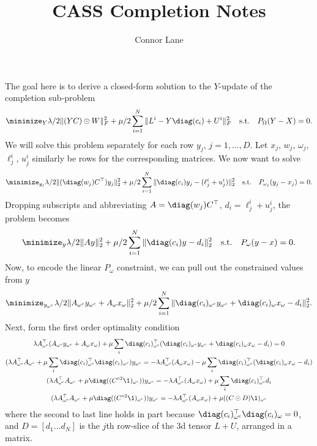 \documentclass[11pt,letterpaper]{article}
\begin{document}
\title{CASS Completion Notes}
\author{Connor Lane}
\maketitle

The goal here is to derive a closed-form solution to the $Y$-update of the
completion sub-problem
\[ \minimize_Y \lambda/2 \|(YC) \odot W \|_F^2 + \mu/2 \sum_{i=1}^N \|L^i - Y
\diag(c_i) + U^i \|_F^2 \quad \text{s.t.} \quad P_\Omega(Y-X) = 0. \]
We will solve this problem separately for each row $y_j$, $j=1, \dotsc, D$. Let
$x_j$, $w_j$, $\omega_j$, $\ell^i_j$, $u^i_j$ similarly be rows for the
corresponding matrices. We now want to solve
\[\minimize_{y_j} \lambda/2 \| (\diag(w_j) C^\top) y_j\|_2^2 + \mu/2
\sum_{i=1}^N \|\diag(c_i) y_j - (\ell_j^i + u_j^i)\|_2^2 \quad \text{s.t.}
\quad P_{\omega_j}(y_j - x_j) = 0. \]
Dropping subscripts and abbreviating $A = \diag(w_j) C^\top$, $d_i = \ell^i_j +
u^i_j$, the problem becomes
\[\minimize_{y} \lambda/2 \| A y\|_2^2 + \mu/2 \sum_{i=1}^N \|\diag(c_i) y -
d_i\|_2^2 \quad \text{s.t.} \quad P_{\omega}(y - x) = 0. \]
Now, to encode the linear $P_\omega$ constraint, we can pull out the
constrained values from $y$
\[\minimize_{y_{\omega^c}} \lambda/2 \| A_{\omega^c} y_{\omega^c} + A_{\omega}
x_{\omega} \|_2^2 + \mu/2 \sum_{i=1}^N \|\diag(c_i)_{\omega^c} y_{\omega^c} +
\diag(c_i)_{\omega} x_{\omega} - d_i\|_2^2. \]
Next, form the first order optimality condition
\begin{gather*}
  \lambda A_{\omega^c}^\top( A_{\omega^c} y_{\omega^c} + A_{\omega}
  x_{\omega}) + \mu \sum_i \diag(c_i)_{\omega^c}^\top (\diag(c_i)_{\omega^c}
  y_{\omega^c} + \diag(c_i)_{\omega} x_{\omega} - d_i) = 0 \\
  (\lambda A_{\omega^c}^\top A_{\omega^c} + \mu \sum_i
  \diag(c_i)_{\omega^c}^\top \diag(c_i)_{\omega^c}) y_{\omega^c} = - \lambda
  A_{\omega^c}^\top (A_{\omega} x_\omega) - \mu \sum_i \diag(c_i)_{\omega^c}^\top
  (\diag(c_i)_{\omega} x_{\omega} - d_i) \\
  (\lambda A_{\omega^c}^\top A_{\omega^c} + \mu \diag((C^{\circ 2}
  \1)_{\omega^c})) y_{\omega^c} = - \lambda A_{\omega^c}^\top (A_{\omega}
  x_\omega) + \mu \sum_i \diag(c_i)_{\omega^c}^\top  d_i \\
  (\lambda A_{\omega^c}^\top A_{\omega^c} + \mu \diag((C^{\circ 2}
  \1)_{\omega^c})) y_{\omega^c} = - \lambda A_{\omega^c}^\top (A_{\omega}
  x_\omega) +  \mu ((C \odot D)\1)_{\omega^c}
\end{gather*}
where the second to last line holds in part because $\diag(c_i)_{\omega^c}^\top
\diag(c_i)_\omega = 0$, and $D = [d_1 \dots d_N]$ is the $j$th row-slice of the
3d tensor $L + U$, arranged in a  matrix.
\end{document}

